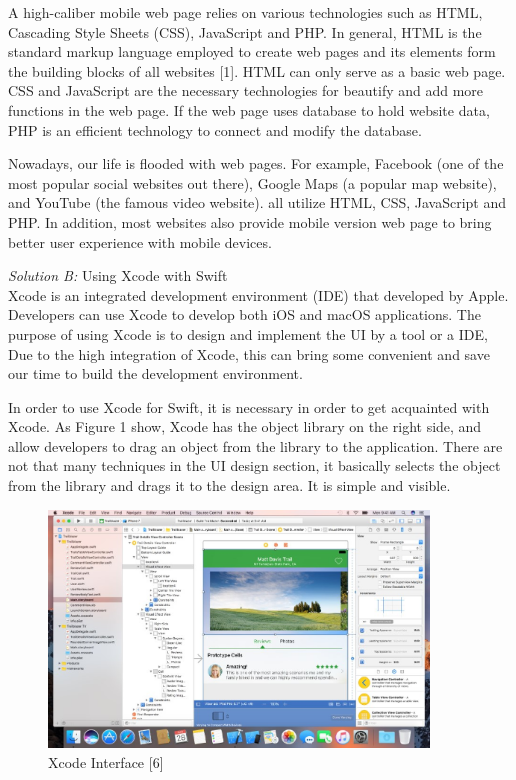 \documentclass[letterpaper, 10pt,titlepage]{article}
\begin{document}
A high-caliber mobile web page relies on various technologies such as HTML, Cascading Style Sheets (CSS), JavaScript and PHP. In general, HTML is the standard markup language employed to create web pages and its elements form the building blocks of all websites [1]. HTML can only serve as a basic web page. CSS and JavaScript are the necessary technologies for beautify and add more functions in the web page. If the web page uses database to hold website data, PHP is an efficient technology to connect and modify the database. 


Nowadays, our life is flooded with web pages. For example, Facebook (one of the most popular social websites out there), Google Maps (a popular map website), and YouTube (the famous video website). all utilize HTML, CSS, JavaScript and PHP. In addition, most websites also provide mobile version web page to bring better user experience with mobile devices.


\textit{Solution B:} Using Xcode with Swift\\
Xcode is an integrated development environment (IDE) that developed by Apple. Developers can use Xcode to develop both iOS and macOS applications. The purpose of using Xcode is to design and implement the UI by a tool or a IDE, Due to the high integration of Xcode, this can bring some convenient and save our time to build the development environment.


In order to use Xcode for Swift, it is necessary in order to get acquainted with Xcode. As Figure 1 show, Xcode has the object library on the right side, and allow developers to drag an object from the library to the application. There are not that many techniques in the UI design section, it basically selects the object from the library and drags it to the design area. It is simple and visible.

\begin{figure}[ht]
    \centering
    \includegraphics[width=0.9\textwidth]{j1}
    \caption{Xcode Interface [6]}
    \label{jiawei1}
\end{figure}
\end{document}
